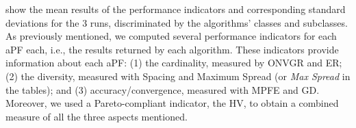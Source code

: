  show the mean results of the performance indicators and corresponding standard deviations for the $3$ runs, discriminated by the algorithms' classes and subclasses. As previously mentioned, we computed several performance indicators for each \ac{aPF} each, i.e., the results returned by each algorithm. These indicators provide information about each \ac{aPF}: (1) the cardinality, measured by \ac{ONVGR} and \ac{ER}; (2) the diversity, measured with Spacing and Maximum Spread (or \textit{Max Spread} in the tables); and (3) accuracy/convergence, measured with \ac{MPFE} and \ac{GD}. Moreover, we used a Pareto-compliant indicator, the \ac{HV}, to obtain a combined measure of all the three aspects mentioned. %


